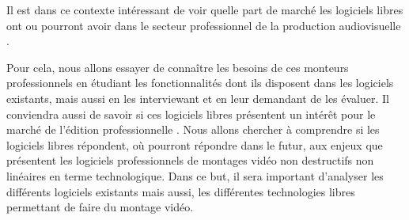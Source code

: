 Il est dans ce contexte intéressant de voir quelle part de marché les
logiciels libres ont ou pourront avoir dans le secteur professionnel de
la production audiovisuelle .

Pour cela, nous allons essayer de connaître les besoins de ces monteurs
professionnels en étudiant les fonctionnalités dont ils disposent
dans les logiciels existants, mais aussi en les interviewant et en
leur demandant de les évaluer.  Il conviendra aussi de savoir si ces
logiciels libres présentent un intérêt pour le marché de l'édition
professionnelle . Nous allons chercher à comprendre si les logiciels
libres répondent, où pourront répondre dans le futur, aux enjeux
que présentent les logiciels professionnels de montages vidéo non
destructifs non linéaires en terme technologique. Dans ce but, il sera
important d'analyser les différents logiciels existants mais aussi, les
différentes technologies libres permettant de faire du montage vidéo.
